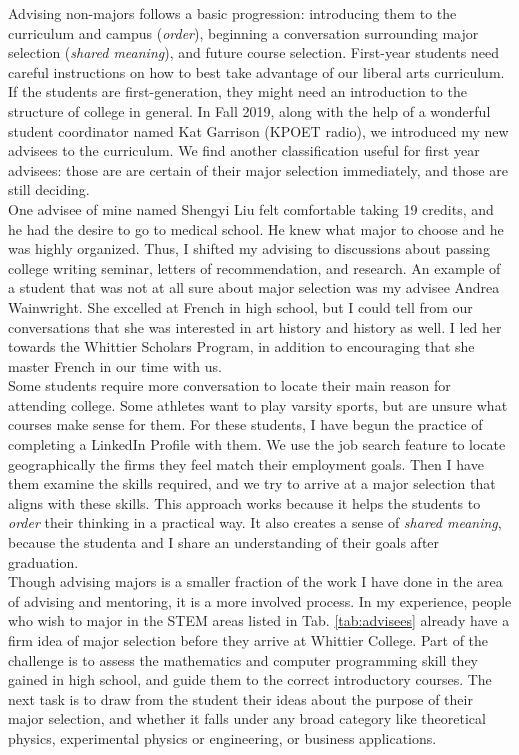 \documentclass[../../../main.tex]{subfiles}
\begin{document}
Advising non-majors follows a basic progression: introducing them to the curriculum and campus (\textit{order}), beginning a conversation surrounding major selection (\textit{shared meaning}), and future course selection.  First-year students need careful instructions on how to best take advantage of our liberal arts curriculum.  If the students are first-generation, they might need an introduction to the structure of college in general.  In Fall 2019, along with the help of a wonderful student coordinator named Kat Garrison (KPOET radio), we introduced my new advisees to the curriculum.  We find another classification useful for first year advisees: those are are certain of their major selection immediately, and those are still deciding.
\\
\vspace{0.25cm}
One advisee of mine named Shengyi Liu felt comfortable taking 19 credits, and he had the desire to go to medical school.  He knew what major to choose and he was highly organized.  Thus, I shifted my advising to discussions about passing college writing seminar, letters of recommendation, and research.  An example of a student that was not at all sure about major selection was my advisee Andrea Wainwright.  She excelled at French in high school, but I could tell from our conversations that she was interested in art history and history as well.  I led her towards the Whittier Scholars Program, in addition to encouraging that she master French in our time with us.
\\
\vspace{0.25cm}
Some students require more conversation to locate their main reason for attending college.  Some athletes want to play varsity sports, but are unsure what courses make sense for them.  For these students, I have begun the practice of completing a LinkedIn Profile with them.  We use the job search feature to locate geographically the firms they feel match their employment goals.  Then I have them examine the skills required, and we try to arrive at a major selection that aligns with these skills.  This approach works because it helps the students to \textit{order} their thinking in a practical way.  It also creates a sense of \textit{shared meaning}, because the studenta and I share an understanding of their goals after graduation.
\\
\vspace{0.25cm}
Though advising majors is a smaller fraction of the work I have done in the area of advising and mentoring, it is a more involved process.  In my experience, people who wish to major in the STEM areas listed in Tab. \ref{tab:advisees} already have a firm idea of major selection before they arrive at Whittier College.  Part of the challenge is to assess the mathematics and computer programming skill they gained in high school, and guide them to the correct introductory courses.  The next task is to draw from the student their ideas about the purpose of their major selection, and whether it falls under any broad category like theoretical physics, experimental physics or engineering, or business applications.
\end{document}
